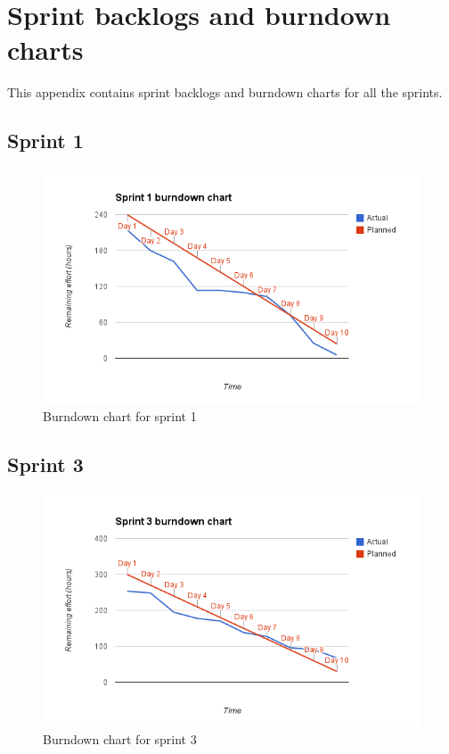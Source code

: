 \chapter{Sprint backlogs and burndown charts}
This appendix contains sprint backlogs and burndown charts for all the sprints.

\section{Sprint 1}
\begin{figure}[H]
\includegraphics[width=\textwidth]{appendix/backlog/burndown1.png}
\caption{Burndown chart for sprint 1}
\end{figure}


\section{Sprint 3}
\begin{figure}[H]
\includegraphics[width=\textwidth]{appendix/backlog/burndown3.png}
\caption{Burndown chart for sprint 3}
\end{figure}


